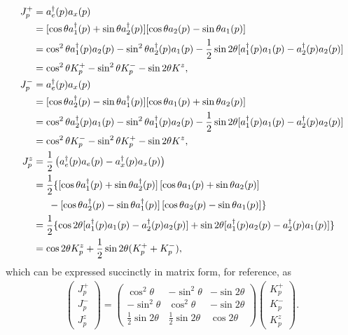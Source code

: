\documentclass[Dual]{msu-thesis}
\begin{document}
\begin{align}
J^+_p
&=
a^\dagger_e(p)a_x(p)
\nonumber
\\
&=
[\cos\theta a^\dagger_1(p)+\sin\theta a^\dagger_2(p)]
[\cos\theta a_2(p)-\sin\theta a_1(p)]
\nonumber
\\
&=
\cos^2\theta a^\dagger_1(p)a_2(p)-\sin^2\theta a_2^\dagger(p)a_1(p)-\frac{1}{2}\sin2\theta[a^\dagger_1(p)a_1(p)-a^\dagger_2(p)a_2(p)]
\nonumber
\\
&=
\cos^2\theta K^+_p-\sin^2\theta K^-_p-\sin2\theta K^z,
\\
J^-_p
&=
a^\dagger_e(p)a_x(p)
\nonumber
\\
&=
[\cos\theta a^\dagger_2(p)-\sin\theta a^\dagger_1(p)]
[\cos\theta a_1(p)+\sin\theta a_2(p)]
\nonumber
\\
&=
\cos^2\theta a_2^\dagger(p)a_1(p)
-
\sin^2\theta a^\dagger_1(p)a_2(p)
-
\frac{1}{2}\sin2\theta[a^\dagger_1(p)a_1(p)-a^\dagger_2(p)a_2(p)]
\nonumber
\\
&=
\cos^2\theta K^-_p-\sin^2\theta K^+_p-\sin2\theta K^z,
\\
J^z_p
&=
\frac{1}{2}\left(a^\dagger_e(p)a_e(p)-a^\dagger_x(p)a_x(p)\right)
\nonumber
\\
&=
\frac{1}{2}
\{
[
\cos\theta a^\dagger_1(p)+\sin\theta a^\dagger_2(p)
]
\left[
\cos\theta a_1(p)+\sin\theta a_2(p)
\right]
\nonumber
\\
&\hspace{5.5mm}-
[
\cos\theta a^\dagger_2(p)-\sin\theta a^\dagger_1(p)
]
\left[
\cos\theta a_2(p)-\sin\theta a_1(p)
\right]
\}
\nonumber
\\
&=
\frac{1}{2}
\{
\cos2\theta[a^\dagger_1(p)a_1(p)-a^\dagger_2(p)a_2(p)]
+
\sin2\theta[a^\dagger_1(p)a_2(p)-a^\dagger_2(p)a_1(p)]
\}
\nonumber
\\
&=
\cos2\theta K^z_p+\frac{1}{2}\sin2\theta(K^+_p+K^-_p)
,\end{align}
which can be expressed succinctly in matrix form, for reference, as
\begin{align}
\begin{pmatrix}
J^+_p \\ J^-_p \\ J^z_p
\end{pmatrix}
=
\begin{pmatrix}
\cos^2\theta & -\sin^2\theta & -\sin2\theta \\
-\sin^2\theta & \cos^2\theta & -\sin2\theta \\
\frac{1}{2}\sin2\theta & \frac{1}{2}\sin2\theta & \cos2\theta
\end{pmatrix}
\begin{pmatrix}
K^+_p \\ K^-_p \\ K^z_p
\end{pmatrix}
.\end{align}
\end{document}
